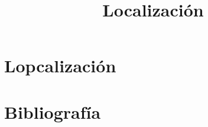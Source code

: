 \documentclass[aspectratio=169,compress]{beamer}
\title{Localización}
\author{}
\institute{Universidad Nacional de Rosario}
\date{}
\begin{document}
	
	\frame{\titlepage}
	
	\section{Lopcalización}
	
	
	\section{Bibliografía}
	
	
\end{document}
